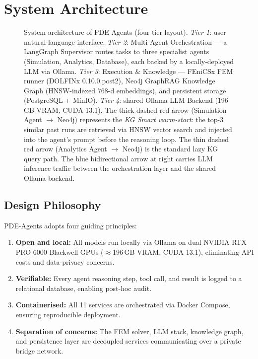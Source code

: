 \documentclass[twocolumn]{article}
\begin{document}
\section{System Architecture}
\label{sec:system}

\begin{figure}[htbp]
  \centering
  \resizebox{\textwidth}{!}{}
  \caption{System architecture of PDE-Agents (four-tier layout).
    \textit{Tier 1}: user natural-language interface.
    \textit{Tier 2}: Multi-Agent Orchestration — a LangGraph Supervisor
    routes tasks to three specialist agents (Simulation, Analytics,
    Database), each backed by a locally-deployed LLM via Ollama.
    \textit{Tier 3}: Execution \& Knowledge — FEniCSx FEM runner
    (DOLFINx 0.10.0.post2), Neo4j GraphRAG Knowledge Graph
    (HNSW-indexed 768-d embeddings), and persistent storage
    (PostgreSQL + MinIO).
    \textit{Tier 4}: shared Ollama LLM Backend (196\,GB VRAM,
    CUDA 13.1).  The thick dashed red arrow (Simulation Agent
    $\rightarrow$ Neo4j) represents the \textit{KG Smart warm-start}:
    the top-3 similar past runs are retrieved via HNSW vector search
    and injected into the agent's prompt before the reasoning loop.
    The thin dashed red arrow (Analytics Agent $\rightarrow$ Neo4j)
    is the standard lazy KG query path.  The blue bidirectional arrow
    at right carries LLM inference traffic between the orchestration
    layer and the shared Ollama backend.}
  \label{fig:arch}
\end{figure}

\subsection{Design Philosophy}

PDE-Agents adopts four guiding principles:
\begin{enumerate}
  \item \textbf{Open and local:} All models run locally via Ollama on
        dual NVIDIA RTX PRO 6000 Blackwell GPUs ($\approx$196\,GB VRAM,
        CUDA 13.1), eliminating API costs and data-privacy concerns.
  \item \textbf{Verifiable:} Every agent reasoning step, tool call, and result
        is logged to a relational database, enabling post-hoc audit.
  \item \textbf{Containerised:} All 11 services are orchestrated via
        Docker Compose, ensuring reproducible deployment.
  \item \textbf{Separation of concerns:} The FEM solver, LLM stack,
        knowledge graph, and persistence layer are decoupled services
        communicating over a private bridge network.
\end{enumerate}
\end{document}
